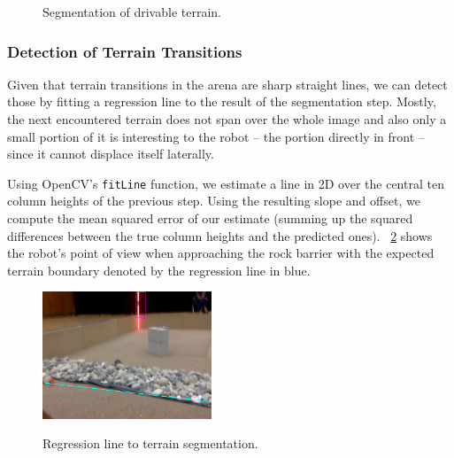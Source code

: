 \begin{figure}
\center
{}
\hfill
{}
\label{fig:segmentation}
\caption{Segmentation of drivable terrain.}
\end{figure}

\subsubsection{Detection of Terrain Transitions}
Given that terrain transitions in the arena are sharp straight lines, we can detect
those by fitting a regression line to the result of the segmentation step. Mostly, the
next encountered terrain does not span over the whole image and also only a small portion
of it is interesting to the robot -- the portion directly in front -- since it cannot
displace itself laterally.

Using OpenCV's \texttt{fitLine} function, we estimate a line in
2D over the central ten column heights of the previous step. Using the resulting
slope and offset, we compute the mean squared error of our estimate (summing up the 
squared differences between the true column heights and the predicted ones).
\figurename~\ref{fig:transition} shows the robot's point of view when approaching the
rock barrier with the expected terrain boundary denoted by the regression line in blue.

\begin{figure}
\centering
\includegraphics[width=0.45\textwidth]{figures/terrain-transition.png}
\label{fig:transition}
\caption{Regression line to terrain segmentation.}
\end{figure}

